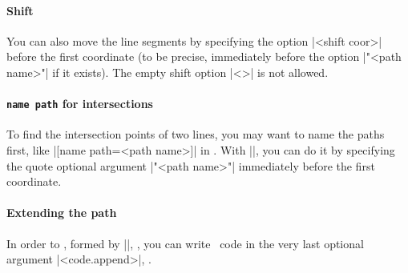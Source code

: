 \begin{tzcode}{.3}
\end{tzcode}

\paragraph{Shift} You can also move the line segments by specifying the option |<shift coor>| before the first coordinate (to be precise, immediately before the option |"<path name>"| if it exists).
The empty shift option |<>| is not allowed.

\begin{tzcode}{.3}
\end{tzcode}

\paragraph{\texttt{name path} for intersections}

To find the intersection points of two lines, you may want to name the paths first, like |[name path=<path name>]| in \Tikz. With |\tzplot|, you can do it by specifying the quote optional argument |"<path name>"| immediately before the first coordinate.

\begin{tzcode}{.3}
\end{tzcode}

\paragraph{Extending the path}
In order to , formed by |\tzplot|, , you can write \Tikz\ code in the very last optional argument |<code.append>|, .

